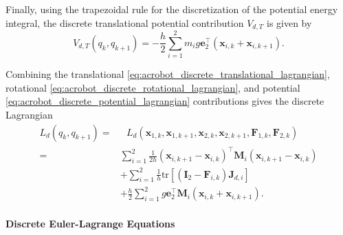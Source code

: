Finally, using the trapezoidal rule for the discretization of the potential energy integral, the discrete translational potential contribution $V_{d,T}$
is given by
\begin{equation}
    V_{d,T}(q_k,q_{k+1})
    =
    -
    \frac{h}{2}
    \sum_{i=1}^{2}
    m_i g
    \bm{e}_{2}^{\top}
    \left(
    \bm{x}_{i,k}
    +
    \bm{x}_{i,k+1}
    \right).
    \label{eq:acrobot_discrete_potential_lagrangian}
\end{equation}

Combining the translational \eqref{eq:acrobot_discrete_translational_lagrangian}, rotational \eqref{eq:acrobot_discrete_rotational_lagrangian}, and potential \eqref{eq:acrobot_discrete_potential_lagrangian} contributions gives the
discrete Lagrangian
\begin{equation}
    \begin{aligned}
    L_d(q_k,q_{k+1})
    =
    &
    \text{  }
    L_d
    \left(
    \bm{x}_{1,k},\bm{x}_{1,k+1},
    \bm{x}_{2,k},\bm{x}_{2,k+1},
    \bm{F}_{1,k},\bm{F}_{2,k}
    \right)  \\
    =
    &
    \sum_{i=1}^{2}
    \frac{1}{2h}
    \left(
    \bm{x}_{i,k+1}-\bm{x}_{i,k}
    \right)^{\top}
    \bm{M}_i
    \left(
    \bm{x}_{i,k+1}-\bm{x}_{i,k}
    \right)  \\
    &
    +
    \sum_{i=1}^{2}
    \frac{1}{h}
    \mathrm{tr}
    \left[
    \left(
    \bm{I}_{2}
    -
    \bm{F}_{i,k}
    \right)
    \bm{J}_{d,i}
    \right]   \\
    &
    +
    \frac{h}{2}
    \sum_{i=1}^{2}
    g
    \bm{e}_{2}^{\top}
    \bm{M}_i
    \left(
    \bm{x}_{i,k}
    +
    \bm{x}_{i,k+1}
    \right).
    \end{aligned}
    \label{eq:acrobot_discrete_lagrangian}
\end{equation}

\paragraph{Discrete Euler-Lagrange Equations}

